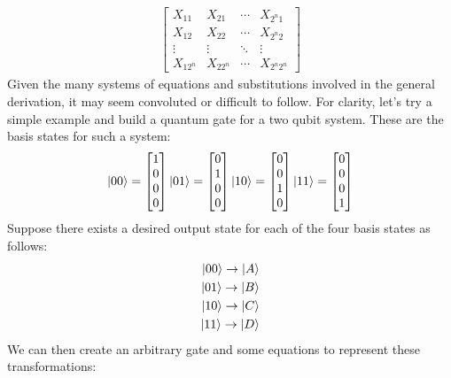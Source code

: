 \documentclass{article}
\begin{document}
\begin{align*}
	\begin{bmatrix}
		X_{11} & X_{21} & \cdots & X_{2^{n}1} \\
		X_{12} & X_{22} & \cdots & X_{2^{n}2} \\
		\vdots & \vdots & \ddots & \vdots \\
		X_{12^{n}} & X_{22^{n}} & \cdots & X_{2^{n}2^{n}}
	\end{bmatrix}
\end{align*}
Given the many systems of equations and substitutions involved in the general derivation, it may seem convoluted or difficult to follow.
For clarity, let's try a simple example and build a quantum gate for a two qubit system. These are the basis states for such a system:
\[
	\ket{00} =
	\begin{bmatrix}
		1 \\
		0 \\
		0 \\
		0		
	\end{bmatrix}
	\ket{01} =
	\begin{bmatrix}
		0 \\
		1 \\
		0 \\
		0	
	\end{bmatrix}
	\ket{10} =
	\begin{bmatrix}
		0 \\
		0 \\
		1 \\
		0
	\end{bmatrix}
	\ket{11} =
	\begin{bmatrix}
		0 \\
		0 \\
		0 \\
		1
	\end{bmatrix}
\]
Suppose there exists a desired output state for each of the four basis states as follows:
\begin{align*}
	\ket{00} \rightarrow \ket{A} \\
	\ket{01} \rightarrow \ket{B} \\
	\ket{10} \rightarrow \ket{C} \\
	\ket{11} \rightarrow \ket{D}
\end{align*}
We can then create an arbitrary gate and some equations to represent these transformations:
\end{document}
